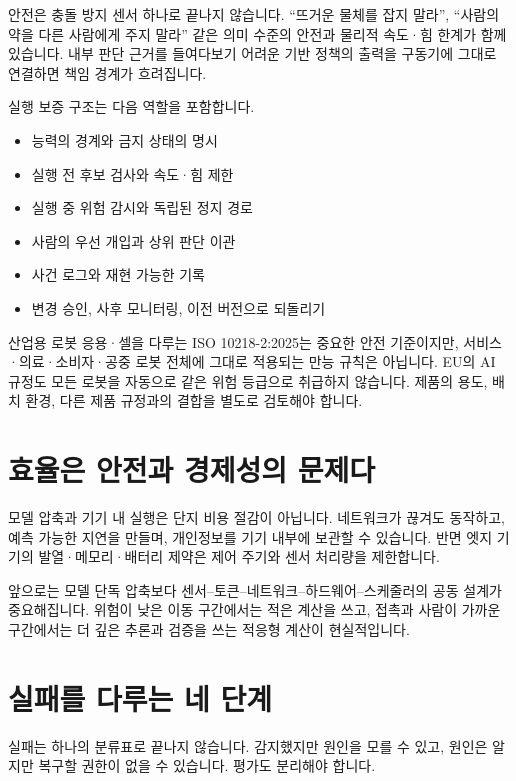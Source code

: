\documentclass[11pt,openany]{book}
\begin{document}
안전은 충돌 방지 센서 하나로 끝나지 않습니다. ``뜨거운 물체를 잡지 말라'', ``사람의 약을 다른 사람에게 주지 말라'' 같은 의미 수준의 안전과 물리적 속도·힘 한계가 함께 있습니다. 내부 판단 근거를 들여다보기 어려운 기반 정책의 출력을 구동기에 그대로 연결하면 책임 경계가 흐려집니다.

실행 보증 구조는 다음 역할을 포함합니다.

\begin{itemize}
  \item 능력의 경계와 금지 상태의 명시
  \item 실행 전 후보 검사와 속도·힘 제한
  \item 실행 중 위험 감시와 독립된 정지 경로
  \item 사람의 우선 개입과 상위 판단 이관
  \item 사건 로그와 재현 가능한 기록
  \item 변경 승인, 사후 모니터링, 이전 버전으로 되돌리기
\end{itemize}

\begin{cautionbox}
산업용 로봇 응용·셀을 다루는 ISO 10218-2:2025는 중요한 안전 기준이지만, 서비스·의료·소비자·공중 로봇 전체에 그대로 적용되는 만능 규칙은 아닙니다. EU의 AI 규정도 모든 로봇을 자동으로 같은 위험 등급으로 취급하지 않습니다. 제품의 용도, 배치 환경, 다른 제품 규정과의 결합을 별도로 검토해야 합니다.
\end{cautionbox}

\section{효율은 안전과 경제성의 문제다}

모델 압축과 기기 내 실행은 단지 비용 절감이 아닙니다. 네트워크가 끊겨도 동작하고, 예측 가능한 지연을 만들며, 개인정보를 기기 내부에 보관할 수 있습니다. 반면 엣지 기기의 발열·메모리·배터리 제약은 제어 주기와 센서 처리량을 제한합니다.

앞으로는 모델 단독 압축보다 센서--토큰--네트워크--하드웨어--스케줄러의 공동 설계가 중요해집니다. 위험이 낮은 이동 구간에서는 적은 계산을 쓰고, 접촉과 사람이 가까운 구간에서는 더 깊은 추론과 검증을 쓰는 적응형 계산이 현실적입니다.

\section{실패를 다루는 네 단계}

실패는 하나의 분류표로 끝나지 않습니다. 감지했지만 원인을 모를 수 있고, 원인은 알지만 복구할 권한이 없을 수 있습니다. 평가도 분리해야 합니다.
\end{document}
